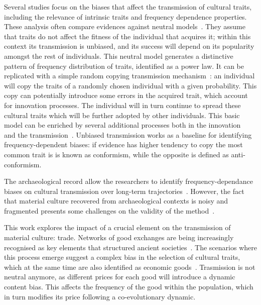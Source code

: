 \documentclass{wscpaperproc}
\begin{document}
Several studies focus on the biases that affect the transmission of cultural traits, including the relevance of intrinsic traits and frequency dependence properties. These analysis often compare evidences against neutral models~\cite{neiman_stylistic_1995}. They assume that traits do not affect the fitness of the individual that acquires it; within this context its transmission is unbiased, and its success will depend on its popularity amongst the rest of individuals. This neutral model generates a distinctive pattern of frequency distribution of traits, identified as a power law. It can be replicated with a simple random copying transmission mechanism~\cite{bentley_random_2004}: an individual will copy the traits of a randomly chosen individual with a given probability. This copy can potentially introduce some errors in the acquired trait, which account for innovation processes. The individual will in turn continue to spread these cultural traits which will be further adopted by other individuals. This basic model can be enriched by several additional processes both in the innovation~ and the transmission~\cite{heyes_social_1994,henrich_evolution_2003}. Unbiased transmission works as a baseline for identifying frequency-dependent biases: if evidence has higher tendency to copy the most common trait is is known as conformism, while the opposite is defined as anti-conformism.

The archaeological record allow the researchers to identify frequency-dependance biases on cultural transmission over long-term trajectories~\cite{lipo_neutralitystyle_2001,shennan_ceramic_2001,steele_ceramic_2010}. However, the fact that material culture recovered from archaeological contexts is noisy and fragmented presents some challenges on the validity of the method~\cite{kandler_nonequilibrium_2013,porcic_exploring_2014,crema_approximate_2014}.

This work explores the impact of a crucial element on the transmission of material culture: trade. Networks of good exchanges are being increasingly recognised as key elements that structured ancient societies~. The scenarios where this process emerge suggest a complex bias in the selection of cultural traits, which at the same time are also identified as economic goods~\cite{bentley_specialisation_2005,macmillan_agent-based_2008}. Trasmission is not neutral anymore, as different prices for each good will introduce a dynamic content bias. This affects the frequency of the good within the population, which in turn modifies its price following a co-evolutionary dynamic.
\end{document}
